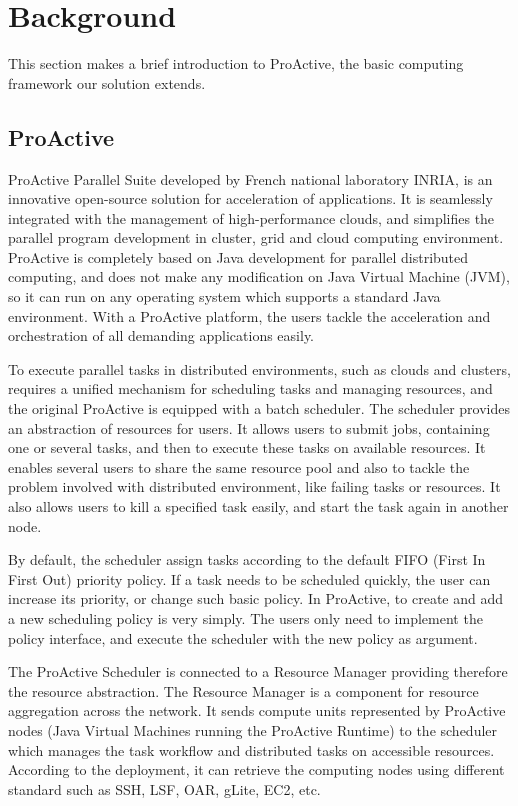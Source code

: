 \section{Background}

This section makes a brief introduction to ProActive, the basic computing framework our solution extends.

\subsection{ProActive}

ProActive Parallel Suite developed by French national laboratory INRIA, is an innovative open-source solution for acceleration of applications. It is seamlessly integrated with the management of high-performance clouds, and simplifies the parallel program development in cluster, grid and cloud computing environment. ProActive is completely based on Java development for parallel distributed computing, and does not make any modification on Java Virtual Machine (JVM), so it can run on any operating system which supports a standard Java environment. With a ProActive platform, the users tackle the acceleration and orchestration of all demanding applications easily. %

To execute parallel tasks in distributed environments, such as clouds and clusters, requires a unified mechanism for scheduling tasks and managing resources, and the original ProActive is equipped with a batch scheduler. %
The scheduler provides an abstraction of resources for users. It allows users to submit jobs, containing one or several tasks, and then to execute these tasks on available resources. It enables several users to share the same resource pool and also to tackle the problem involved with distributed environment, like failing tasks or resources. It also allows users to kill a specified task easily, and start the task again in another node.

By default, the scheduler assign tasks according to the default FIFO (First In First Out) priority policy. If a task needs to be scheduled quickly, the user can increase its priority, or change such basic policy. In ProActive, to create and add a new scheduling policy is very simply. The users only need to implement the policy interface, and execute the scheduler with the new policy as argument.

The ProActive Scheduler is connected to a Resource Manager providing therefore the resource abstraction. %
The Resource Manager is a component for resource aggregation across the network. It sends compute units represented by ProActive nodes (Java Virtual Machines running the ProActive Runtime)   to the scheduler which manages the task workflow and distributed tasks on accessible resources. According to the deployment, it can retrieve the computing nodes using different standard such as SSH, LSF, OAR, gLite, EC2, etc.

